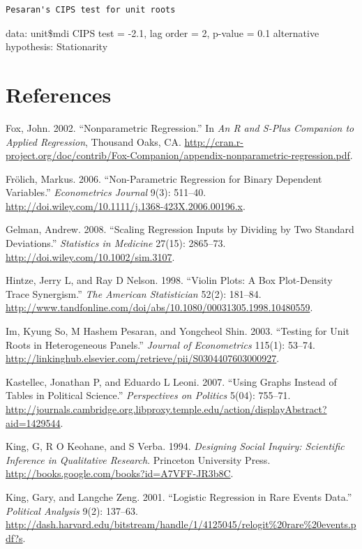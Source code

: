 \documentclass[11pt,article,oneside]{memoir}
\begin{document}
\begin{verbatim}
Pesaran's CIPS test for unit roots
\end{verbatim}

data: unit\$mdi CIPS test = -2.1, lag order = 2, p-value = 0.1
alternative hypothesis: Stationarity

\section{References}\label{references}

\setlength{\parindent}{-0.2in} \setlength{\leftskip}{0.2in}
\setlength{\parskip}{8pt} \vspace*{-0.2in} \noindent

Fox, John. 2002. ``Nonparametric Regression.'' In \emph{An R and S-Plus
Companion to Applied Regression}, Thousand Oaks, CA.
\url{http://cran.r-project.org/doc/contrib/Fox-Companion/appendix-nonparametric-regression.pdf}.

Fr{ö}lich, Markus. 2006. ``Non-Parametric Regression for Binary
Dependent Variables.'' \emph{Econometrics Journal} 9(3): 511--40.
\url{http://doi.wiley.com/10.1111/j.1368-423X.2006.00196.x}.

Gelman, Andrew. 2008. ``Scaling Regression Inputs by Dividing by Two
Standard Deviations.'' \emph{Statistics in Medicine} 27(15): 2865--73.
\url{http://doi.wiley.com/10.1002/sim.3107}.

Hintze, Jerry L, and Ray D Nelson. 1998. ``Violin Plots: A Box
Plot-Density Trace Synergism.'' \emph{The American Statistician} 52(2):
181--84.
\url{http://www.tandfonline.com/doi/abs/10.1080/00031305.1998.10480559}.

Im, Kyung So, M Hashem Pesaran, and Yongcheol Shin. 2003. ``Testing for
Unit Roots in Heterogeneous Panels.'' \emph{Journal of Econometrics}
115(1): 53--74.
\url{http://linkinghub.elsevier.com/retrieve/pii/S0304407603000927}.

Kastellec, Jonathan P, and Eduardo L Leoni. 2007. ``Using Graphs Instead
of Tables in Political Science.'' \emph{Perspectives on Politics} 5(04):
755--71.
\url{http://journals.cambridge.org.libproxy.temple.edu/action/displayAbstract?aid=1429544}.

King, G, R O Keohane, and S Verba. 1994. \emph{Designing Social Inquiry:
Scientific Inference in Qualitative Research}. Princeton University
Press. \url{http://books.google.com/books?id=A7VFF-JR3b8C}.

King, Gary, and Langche Zeng. 2001. ``Logistic Regression in Rare Events
Data.'' \emph{Political Analysis} 9(2): 137--63.
\url{http://dash.harvard.edu/bitstream/handle/1/4125045/relogit\%20rare\%20events.pdf?s}.
\end{document}
